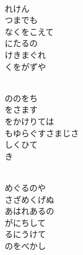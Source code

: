 \documentclass[10pt,b5j]{tarticle} %
\begin{document}
\vspace{1.5em} %
\newcommand{\linespace}{0.5em} %
\newcommand{\blocksize}{0.5\hsize} %
\newcommand{\itemmargin}{6em} %
\begin{enumerate} %
    \setlength{\itemindent}{\itemmargin} %
    \begin{minipage}[c]{\blocksize}
    
        \vspace{\linespace}
        \item~\\
        れけん\\
        つまでも\\
        なくをこえて\\
        にたるの\\
        けきまぐれ\\
        くをがずや
        
        \vspace{\linespace}
        \item~\\
        ののをち\\
        をさます\\
        をかけりては\\
        もゆらぐすさまじさ\\
        しくひて\\
        き
        
        \vspace{\linespace}
        \item~\\
        めぐるのや\\
        さざめくげぬ\\
        あはれあるの\\
        がにちして\\
        るにうけて\\
        のをべかし
        

\end{minipage}
\end{enumerate}
\end{document}
